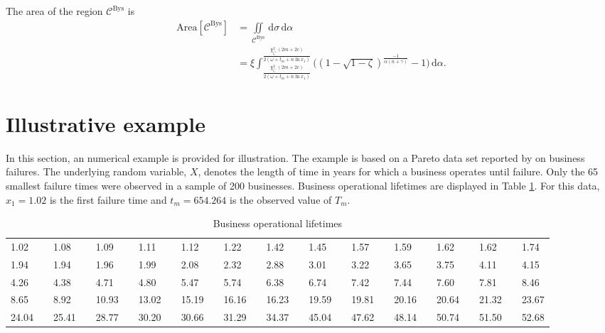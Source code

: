 \documentclass[twoside]{article}
\begin{document}
%
The area of the region $\mathcal{C}^{\textrm{Bys}}$ is
\begin{align}
	\textrm{Area}[\mathcal{C}^{\text{Bys}}]&=\iint\limits_{\mathcal{C}^{\text{Bys}}}\,\mathrm{d}\sigma\,\mathrm{d}\alpha\nonumber\\
	&=\xi\int_{\frac{\chi^2_{\zeta^-}(2m+2c)}{2(\omega+t_m+n\ln x_1)}}^{\frac{\chi^2_{\zeta^+}(2m+2c)}{2(\omega+t_m+n\ln x_1)}}\Big(\left(1 - \sqrt{1 - \zeta}\right)^{\frac{-1}{\alpha(n + \gamma)}}-1\Big)\,\mathrm{d}\alpha.\label{BS-area}
\end{align}





\section{Illustrative example}\label{example-section}
In this section, an numerical example is provided for illustration. The example is based on a Pareto data set reported by \cite{Hong-et-al} on business failures. The underlying
random variable, $X$, denotes the length of time in years for which a business operates until failure. Only the 65 smallest
failure times were observed in a sample of 200 businesses. Business operational lifetimes are displayed in Table \ref{business-failures-data}. For this data, $x_1=1.02$ is the first failure time and $t_m=654.264$ is the observed value of $T_m$.

%
\begin{table}[ht!]
	\small
	\caption{Business operational lifetimes}\label{business-failures-data}
	\setlength{\tabcolsep}{.63mm}
	\renewcommand{\arraystretch}{1.1}
\begin{center}
		\begin{tabular}{lllllllllllllllllllllllll}
		\hline
		1.02&& 1.08&& 1.09&& 1.11&& 1.12&& 1.22&& 1.42&& 1.45&& 1.57&& 1.59&& 1.62&& 1.62&& 1.74\\
		1.94&& 1.94&& 1.96&& 1.99&& 2.08&& 2.32&& 2.88&& 3.01&& 3.22&& 3.65&& 3.75&& 4.11&& 4.15\\
		4.26&& 4.38&& 4.71&& 4.80&& 5.47&& 5.74&& 6.38&& 6.74&& 7.42&& 7.44&& 7.60&& 7.81&& 8.46\\
		8.65&& 8.92&& 10.93&& 13.02&& 15.19&& 16.16&& 16.23&& 19.59&& 19.81&& 20.16&& 20.64&& 21.32&& 23.67\\
		24.04&& 25.41&& 28.77&& 30.20&& 30.66&& 31.29&& 34.37&& 45.04&& 47.62&& 48.14&& 50.74&& 51.50&& 52.68\\
		\hline
	\end{tabular}
\end{center}	
\end{table}
\end{document}
